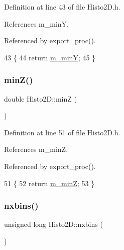 Definition at line 43 of file Histo2\+D.\+h.



References m\+\_\+minY.



Referenced by export\+\_\+proc().


\begin{DoxyCode}
43                \{
44     \textcolor{keywordflow}{return} \hyperlink{classHisto2D_a5bea9523f4ac077b0cc72cc1b28e0834}{m\_minY};
45   \}
\end{DoxyCode}
\mbox{\label{classHisto2D_a68cfc2d92fbc5ce2efa1d6b5781ea621}} 
\subsubsection{\texorpdfstring{min\+Z()}{minZ()}}
{\footnotesize\ttfamily double Histo2\+D\+::minZ (\begin{DoxyParamCaption}{ }\end{DoxyParamCaption})\hspace{0.3cm}{\ttfamily [inline]}}



Definition at line 51 of file Histo2\+D.\+h.



References m\+\_\+minZ.



Referenced by export\+\_\+proc().


\begin{DoxyCode}
51                \{
52     \textcolor{keywordflow}{return} \hyperlink{classHisto2D_a6cfa2290ee0d786b37f7ed08129c60e3}{m\_minZ};
53   \}
\end{DoxyCode}
\mbox{\label{classHisto2D_aac422991db96030ce7ca3952e4d277f2}} 
\subsubsection{\texorpdfstring{nxbins()}{nxbins()}}
{\footnotesize\ttfamily unsigned long Histo2\+D\+::nxbins (\begin{DoxyParamCaption}{ }\end{DoxyParamCaption})\hspace{0.3cm}{\ttfamily [inline]}}



